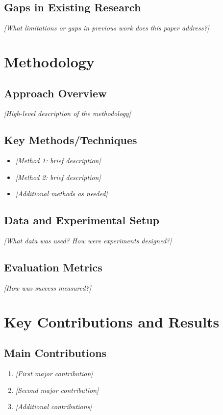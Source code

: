 \documentclass[11pt]{article}
\begin{document}
	\subsection{Gaps in Existing Research}
	\textit{[What limitations or gaps in previous work does this paper address?]}
	
	\section{Methodology}
	\subsection{Approach Overview}
	\textit{[High-level description of the methodology]}
	
	\subsection{Key Methods/Techniques}
	\begin{itemize}
		\item \textit{[Method 1: brief description]}
		\item \textit{[Method 2: brief description]}
		\item \textit{[Additional methods as needed]}
	\end{itemize}
	
	\subsection{Data and Experimental Setup}
	\textit{[What data was used? How were experiments designed?]}
	
	\subsection{Evaluation Metrics}
	\textit{[How was success measured?]}
	
	\section{Key Contributions and Results}
	\subsection{Main Contributions}
	\begin{enumerate}
		\item \textit{[First major contribution]}
		\item \textit{[Second major contribution]}
		\item \textit{[Additional contributions]}
	\end{enumerate}
	
\end{document}
